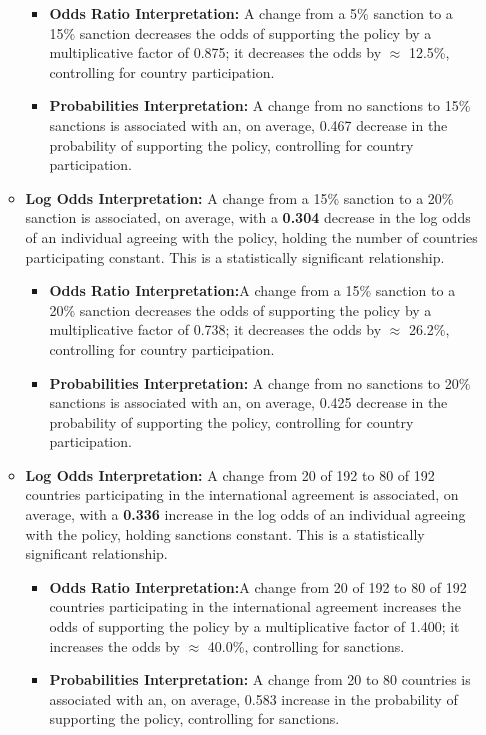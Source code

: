 \documentclass[12pt,letterpaper]{article}
\begin{document}
\begin{enumerate}
\begin{itemize}
		\begin{itemize}
			\item \textbf{Odds Ratio Interpretation:} A change from a 5\% sanction to a 15\% sanction decreases the odds of supporting the policy by a multiplicative factor of 0.875; it
			decreases the odds by $\approx$ 12.5\%, controlling for country participation.
				\item \textbf{Probabilities Interpretation:} A change from no sanctions to 15\% sanctions is associated with an, on average, 0.467 decrease in the probability of supporting the policy, controlling for country participation. 
		\end{itemize}
	\item \textbf{Log Odds Interpretation:} A change from a 15\% sanction to a 20\% sanction is associated, on average, with a \textbf{0.304} decrease in the log odds of an individual agreeing with the policy, holding the number of countries participating constant. This is a statistically significant relationship.
		\begin{itemize}
			\item  \textbf{Odds Ratio Interpretation:}A change from a 15\% sanction to a 20\% sanction decreases the odds of supporting the policy by a multiplicative factor of 0.738; it
			decreases the odds by $\approx$ 26.2\%, controlling for country participation.
				\item \textbf{Probabilities Interpretation:} A change from no sanctions to 20\% sanctions is associated with an, on average, 0.425 decrease in the probability of supporting the policy, controlling for country participation. 
		\end{itemize}
	\item \textbf{Log Odds Interpretation:} A change from 20 of 192 to 80 of 192 countries participating in the international agreement is associated, on average, with a \textbf{0.336} increase in the log odds of an individual agreeing with the policy, holding sanctions constant. This is a statistically significant relationship.
		\begin{itemize}
			\item \textbf{Odds Ratio Interpretation:}A change from 20 of 192 to 80 of 192 countries participating in the international agreement increases the odds of supporting the policy by a multiplicative factor of 1.400; it increases the odds by $\approx$ 40.0\%, controlling for sanctions.
				\item \textbf{Probabilities Interpretation:} A change from 20 to 80 countries is associated with an, on average, 0.583 increase in the probability of supporting the policy, controlling for sanctions. 

\end{itemize}
\end{itemize}
\end{enumerate}
\end{document}
